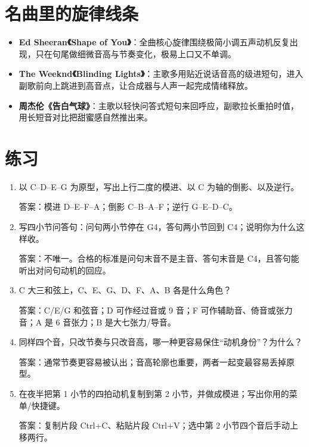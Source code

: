 \section{名曲里的旋律线条}

\begin{itemize}
  \item \textbf{Ed Sheeran《Shape of You》}：全曲核心旋律围绕极简小调五声动机反复出现，只在句尾做细微音高与节奏变化，极易上口又不单调。
  \item \textbf{The Weeknd《Blinding Lights》}：主歌多用贴近说话音高的级进短句，进入副歌前向上跳进到高音点，让合成器与人声一起完成情绪释放。
  \item \textbf{周杰伦《告白气球》}：主歌以轻快问答式短句来回呼应，副歌拉长重拍时值，用长短音对比把甜蜜感自然推出来。
\end{itemize}

\section{练习}


\begin{exercise}
\begin{enumerate}
  \item 以 C–D–E–G 为原型，写出上行二度的模进、以 C 为轴的倒影、以及逆行。
  \par\noindent 答案：模进 D–E–F–A；倒影 C–B–A–F；逆行 G–E–D–C。
  \item 写四小节问答句：问句两小节停在 G4，答句两小节回到 C4；说明你为什么这样收。
  \par\noindent 答案：不唯一。合格的标准是问句末音不是主音、答句末音是 C4，且答句能听出对问句动机的回应。
  \item C 大三和弦上，C、E、G、D、F、A、B 各是什么角色？
  \par\noindent 答案：C/E/G 和弦音；D 可作经过音或 9 音；F 可作辅助音、倚音或张力音；A 是 6 音张力；B 是大七张力/导音。
  \item 同样四个音，只改节奏与只改音高，哪一种更容易保住“动机身份”？为什么？
  \par\noindent 答案：通常节奏更容易被认出；音高轮廓也重要，两者一起变最容易丢掉原型。
  \item 在夜半把第 1 小节的四拍动机复制到第 2 小节，并做成模进；写出你用的菜单/快捷键。
  \par\noindent 答案：复制片段 Ctrl+C、粘贴片段 Ctrl+V；选中第 2 小节四个音后手动上移两行。
\end{enumerate}
\end{exercise}


